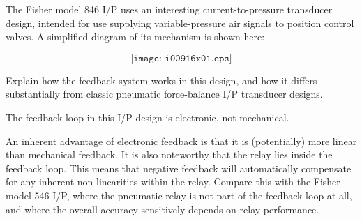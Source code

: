 

The Fisher model 846 I/P uses an interesting current-to-pressure transducer design, intended for use supplying variable-pressure air signals to position control valves.  A simplified diagram of its mechanism is shown here:

$$\texttt{[image: i00916x01.eps]}$$

Explain how the feedback system works in this design, and how it differs substantially from classic pneumatic force-balance I/P transducer designs.







The feedback loop in this I/P design is electronic, not mechanical.







An inherent advantage of electronic feedback is that it is (potentially) more linear than mechanical feedback.  It is also noteworthy that the relay lies inside the feedback loop.  This means that negative feedback will automatically compensate for any inherent non-linearities within the relay.  Compare this with the Fisher model 546 I/P, where the pneumatic relay is not part of the feedback loop at all, and where the overall accuracy sensitively depends on relay performance.




